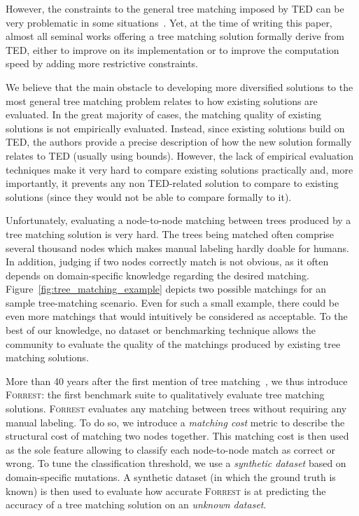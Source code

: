 \documentclass{vldb}
\newcommand{\forrest}[0]{\textsc{Forrest}\xspace}
\begin{document}
However, the constraints to the general tree matching imposed by TED can be very problematic in some situations~\cite{Kumar2011_FTM, reis2004automatic}.
Yet, at the time of writing this paper, almost all seminal works offering a tree matching solution formally derive from TED, either to improve on its implementation or to improve the computation speed by adding more restrictive constraints.

We believe that the main obstacle to developing more diversified solutions to the most general tree matching problem relates to how existing solutions are evaluated.
In the great majority of cases, the matching quality of existing solutions is not empirically evaluated.
Instead, since existing solutions build on TED, the authors provide a precise description of how the new solution formally relates to TED (usually using bounds).
However, the lack of empirical evaluation techniques make it very hard to compare existing solutions practically and, more importantly, it prevents any non TED-related solution to compare to existing solutions (since they would not be able to compare formally to it).

Unfortunately, evaluating a node-to-node matching between trees produced by a tree matching solution is very hard.
The trees being matched often comprise several thousand nodes which makes manual labeling hardly doable for humans.
In addition, judging if two nodes correctly match is not obvious, as it often depends on domain-specific knowledge regarding the desired matching.
Figure~\ref{fig:tree_matching_example} depicts two possible matchings for an sample tree-matching scenario.
Even for such a small example, there could be even more matchings that would intuitively be considered as acceptable.
To the best of our knowledge, no dataset or benchmarking technique allows the community to evaluate the quality of the matchings produced by existing tree matching solutions.

More than 40 years after the first mention of tree matching~\cite{Tai1979}, we thus introduce \forrest: the first benchmark suite to qualitatively evaluate tree matching solutions.
\forrest evaluates any matching between trees without requiring any manual labeling.
To do so, we introduce a \emph{matching cost} metric to describe the structural cost of matching two nodes together. 
This matching cost is then used as the sole feature allowing to classify each node-to-node match as correct or wrong.
To tune the classification threshold, we use a \emph{synthetic dataset} based on domain-specific mutations.
A synthetic dataset (in which the ground truth is known) is then used to evaluate how accurate \forrest is at predicting the accuracy of a tree matching solution on an \emph{unknown dataset}.
\end{document}
